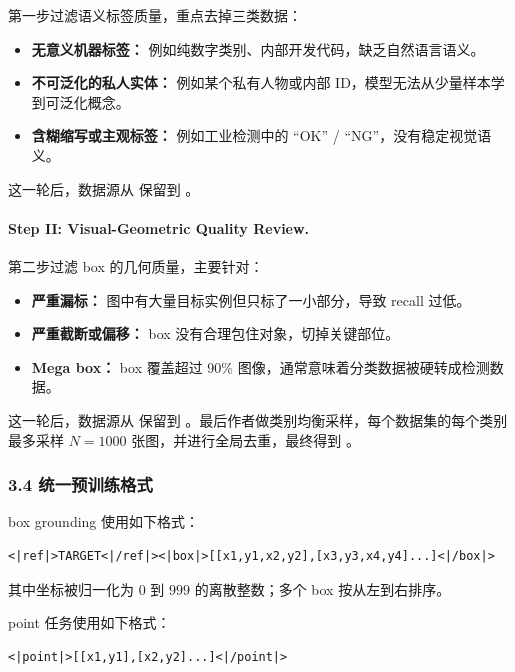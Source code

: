 第一步过滤语义标签质量，重点去掉三类数据：

\begin{itemize}[leftmargin=1.5em]
  \item \textbf{无意义机器标签：} 例如纯数字类别、内部开发代码，缺乏自然语言语义。
  \item \textbf{不可泛化的私人实体：} 例如某个私有人物或内部 ID，模型无法从少量样本学到可泛化概念。
  \item \textbf{含糊缩写或主观标签：} 例如工业检测中的 ``OK'' / ``NG''，没有稳定视觉语义。
\end{itemize}

这一轮后，数据源从  保留到 。

\paragraph{Step II: Visual-Geometric Quality Review.}

第二步过滤 box 的几何质量，主要针对：

\begin{itemize}[leftmargin=1.5em]
  \item \textbf{严重漏标：} 图中有大量目标实例但只标了一小部分，导致 recall 过低。
  \item \textbf{严重截断或偏移：} box 没有合理包住对象，切掉关键部位。
  \item \textbf{Mega box：} box 覆盖超过 90\% 图像，通常意味着分类数据被硬转成检测数据。
\end{itemize}

这一轮后，数据源从  保留到 。最后作者做类别均衡采样，每个数据集的每个类别最多采样 $N=1000$ 张图，并进行全局去重，最终得到 。

\subsubsection{3.4 统一预训练格式}

box grounding 使用如下格式：

\begin{lstlisting}[language={}]
<|ref|>TARGET<|/ref|><|box|>[[x1,y1,x2,y2],[x3,y3,x4,y4]...]<|/box|>
\end{lstlisting}

其中坐标被归一化为 $0$ 到 $999$ 的离散整数；多个 box 按从左到右排序。

point 任务使用如下格式：

\begin{lstlisting}[language={}]
<|point|>[[x1,y1],[x2,y2]...]<|/point|>
\end{lstlisting}

